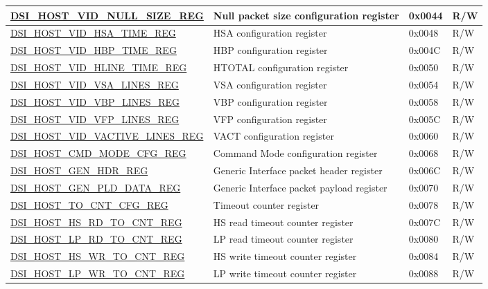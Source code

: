 \begin{longtable}{ | p{6.8cm} | p{6.5cm} | p{1.2cm} | p{1cm} | }
\hyperref[regdesc:DSIHOSTVIDNULLSIZEREG]{DSI\_HOST\_VID\_NULL\_SIZE\_REG} & Null packet size configuration register & 0x0044 & R/W \\ \hline
\hyperref[regdesc:DSIHOSTVIDHSATIMEREG]{DSI\_HOST\_VID\_HSA\_TIME\_REG} & HSA configuration register & 0x0048 & R/W \\ \hline
\hyperref[regdesc:DSIHOSTVIDHBPTIMEREG]{DSI\_HOST\_VID\_HBP\_TIME\_REG} & HBP configuration register & 0x004C & R/W \\ \hline
\hyperref[regdesc:DSIHOSTVIDHLINETIMEREG]{DSI\_HOST\_VID\_HLINE\_TIME\_REG} & HTOTAL configuration register & 0x0050 & R/W \\ \hline
\hyperref[regdesc:DSIHOSTVIDVSALINESREG]{DSI\_HOST\_VID\_VSA\_LINES\_REG} & VSA configuration register & 0x0054 & R/W \\ \hline
\hyperref[regdesc:DSIHOSTVIDVBPLINESREG]{DSI\_HOST\_VID\_VBP\_LINES\_REG} & VBP configuration register & 0x0058 & R/W \\ \hline
\hyperref[regdesc:DSIHOSTVIDVFPLINESREG]{DSI\_HOST\_VID\_VFP\_LINES\_REG} & VFP configuration register & 0x005C & R/W \\ \hline
\hyperref[regdesc:DSIHOSTVIDVACTIVELINESREG]{DSI\_HOST\_VID\_VACTIVE\_LINES\_REG} & VACT configuration register & 0x0060 & R/W \\ \hline
\hyperref[regdesc:DSIHOSTCMDMODECFGREG]{DSI\_HOST\_CMD\_MODE\_CFG\_REG} & Command Mode configuration register & 0x0068 & R/W \\ \hline
\hyperref[regdesc:DSIHOSTGENHDRREG]{DSI\_HOST\_GEN\_HDR\_REG} & Generic Interface packet header register & 0x006C & R/W \\ \hline
\hyperref[regdesc:DSIHOSTGENPLDDATAREG]{DSI\_HOST\_GEN\_PLD\_DATA\_REG} & Generic Interface packet payload register & 0x0070 & R/W \\ \hline
\hyperref[regdesc:DSIHOSTTOCNTCFGREG]{DSI\_HOST\_TO\_CNT\_CFG\_REG} & Timeout counter register & 0x0078 & R/W \\ \hline
\hyperref[regdesc:DSIHOSTHSRDTOCNTREG]{DSI\_HOST\_HS\_RD\_TO\_CNT\_REG} & HS read timeout counter register & 0x007C & R/W \\ \hline
\hyperref[regdesc:DSIHOSTLPRDTOCNTREG]{DSI\_HOST\_LP\_RD\_TO\_CNT\_REG} & LP read timeout counter register & 0x0080 & R/W \\ \hline
\hyperref[regdesc:DSIHOSTHSWRTOCNTREG]{DSI\_HOST\_HS\_WR\_TO\_CNT\_REG} & HS write timeout counter register & 0x0084 & R/W \\ \hline
\hyperref[regdesc:DSIHOSTLPWRTOCNTREG]{DSI\_HOST\_LP\_WR\_TO\_CNT\_REG} & LP write timeout counter register & 0x0088 & R/W \\ \hline

\end{longtable}
